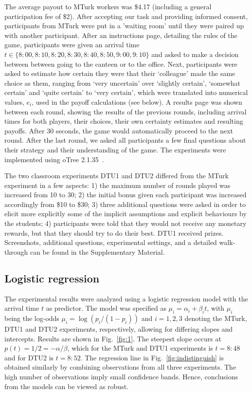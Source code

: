 \documentclass[twocolumn,a4paper,superscriptaddress,nofootinbib]{revtex4}
\begin{document}
The average payout to MTurk workers was \$4.17 (including a general participation fee of \$2). After accepting our task and providing informed consent, participants from MTurk were put in a ’waiting room’ until they were paired up with another participant. After an instructions page, detailing the rules of the game, participants were given an arrival time $t \in \{8{:}00, 8{:}10, 8{:}20, 8{:}30, 8{:}40, 8{:}50, 9{:}00,9{:}10\}$ and asked to make a decision between between going to the canteen or to the office. Next, participants were asked to estimate how certain they were that their `colleague' made the same choice as them, ranging from `very uncertain' over `slightly certain', `somewhat certain' and `quite certain' to `very certain', which were translated  into numerical values, $e_i$, used in the payoff calculations (see below). A results page was shown between each round, showing the results of the previous rounds, including arrival times for both players, their choices, their own certainty estimates and resulting payoffs. After 30 seconds, the game would automatically proceed to the next round. After the last round, we asked all participants a few final questions about their strategy and their understanding of the game. The experiments were implemented using oTree 2.1.35~\citep{ChenSchongerWickens16}.

The two classroom experiments DTU1 and DTU2 differed from the MTurk experiment in a few aspects: 1) the maximum number of rounds played was increased from 10 to 30; 2) the initial bonus given each participant was increased accordingly from \$10 to \$30; 3) three additional questions were asked in order to elicit more explicitly some of the implicit assumptions and explicit behaviours by the students; 4) participants were told that they would not receive any monetary rewards, but that they should try to do their best. DTU1 received prizes. Screenshots, additional questions, experimental settings, and a detailed walk-through can be found in the Supplementary Material.

\subsection{Logistic regression} \label{appendix:logistic} 
The experimental results were analyzed using a logistic regression model with the arrival time $t$ as predictor. The model was specified as $\mu_i = \alpha _{i} + \beta _{i}t$, with $\mu_i$ being the log-odds $\mu_i= \log (p_i/(1-p_i))$ and $i=1,2,3$ denoting the MTurk, DTU1 and DTU2 experiments, respectively, allowing for differing slopes and intercepts. Results are shown in Fig.~\ref{fig:1}. The steepest slope occurs at $p(t) = 1/2 = -\alpha/\beta$, which for the MTurk and DTU1 experiments is $t=8{:}48$ and for DTU2 is $t=8{:}52$. The regression line in Fig.~\ref{fig:indistinguish} is obtained similarly by combining observations from all three experiments. The high number of observations imply small confidence bands. Hence, conclusions from the models can be viewed as robust.
\end{document}
